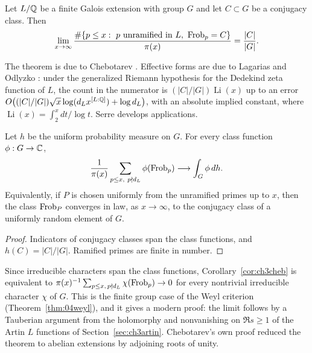\begin{theorem}\label{thm:ch3cheb}
Let $L/\mathbb{Q}$ be a finite Galois extension with group $G$ and let $C\subset G$ be a conjugacy class. Then
\[
\lim_{x\to\infty}\frac{\#\{p\le x:\ p\text{ unramified in }L,\ \operatorname{Frob}_p=C\}}{\pi(x)}=\frac{|C|}{|G|}.
\]
\end{theorem}

The theorem is due to Chebotarev \cite{chebotarev1926}. Effective forms are due to Lagarias and Odlyzko \cite{lagariasodlyzko1977}: under the generalized Riemann hypothesis for the Dedekind zeta function of $L$, the count in the numerator is $(|C|/|G|)\operatorname{Li}(x)$ up to an error $O\bigl((|C|/|G|)\sqrt x\log(d_Lx^{[L:\mathbb{Q}]})+\log d_L\bigr)$, with an absolute implied constant, where $\operatorname{Li}(x)=\int_2^x dt/\log t$. Serre \cite{serre1981} develops applications.

\begin{corollary}\label{cor:ch3cheb}
Let $h$ be the uniform probability measure on $G$. For every class function $\phi:G\to\mathbb{C}$,
\[
\frac{1}{\pi(x)}\sum_{p\le x,\ p\nmid d_L}\phi(\operatorname{Frob}_p)\longrightarrow\int_G\phi\,dh .
\]
Equivalently, if $P$ is chosen uniformly from the unramified primes up to $x$, then the class $\operatorname{Frob}_P$ converges in law, as $x\to\infty$, to the conjugacy class of a uniformly random element of $G$.
\end{corollary}

\begin{proof}
Indicators of conjugacy classes span the class functions, and $h(C)=|C|/|G|$. Ramified primes are finite in number.
\end{proof}

Since irreducible characters span the class functions, Corollary~\ref{cor:ch3cheb} is equivalent to $\pi(x)^{-1}\sum_{p\le x,\,p\nmid d_L}\chi(\operatorname{Frob}_p)\to0$ for every nontrivial irreducible character $\chi$ of $G$. This is the finite group case of the Weyl criterion (Theorem~\ref{thm:04weyl}), and it gives a modern proof: the limit follows by a Tauberian argument from the holomorphy and nonvanishing on $\Re s\ge1$ of the Artin $L$ functions of Section~\ref{sec:ch3artin}. Chebotarev's own proof reduced the theorem to abelian extensions by adjoining roots of unity.

